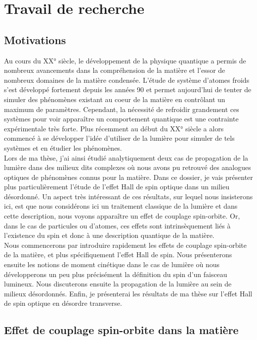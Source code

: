 \documentclass[a4paper,11pt]{article} %
\begin{document}
	
	\section{Travail de recherche}
	\subsection{Motivations}
	Au cours du XX° siècle, le développement de la physique quantique a permis de nombreux avancements dans la compréhension de la matière et l'essor de nombreux domaines de la matière condensée. L'étude de système d'atomes froids s'est développé fortement depuis les années 90 et permet aujourd'hui de tenter de simuler des phénomènes existant au coeur de la matière en contrôlant un maximum de paramètres. Cependant, la nécessité de refroidir grandement ces systèmes pour voir apparaître un comportement quantique est une contrainte expérimentale très forte. Plus récemment au début du XX° siècle a alors commencé à se développer l'idée d'utiliser de la lumière pour simuler de tels systèmes et en étudier les phénomènes.\\
	
	Lors de ma thèse, j'ai ainsi étudié analytiquement deux cas de propagation de la lumière dans des milieux dits complexes où nous avons pu retrouvé des analogues optiques de phénomènes connus pour la matière. Dans ce dossier, je vais présenter plus particulièrement l'étude de l'effet Hall de spin optique dans un milieu désordonné. Un aspect très intéressant de ces résultats, sur lequel nous insisterons ici, est que nous considérons ici un traitement classique de la lumière et dans cette description, nous voyons apparaître un effet de couplage spin-orbite. Or, dans le cas de particules ou d'atomes, ces effets sont intrinsèquement liés à l'existence du spin et donc à une description quantique de la matière.\\
	
	Nous commencerons par introduire rapidement les effets de couplage spin-orbite de la matière, et plus spécifiquement l'effet Hall de spin. Nous présenterons ensuite les notions de moment cinétique dans le cas de lumière où nous développerons un peu plus précisément la définition du spin d'un faisceau lumineux. Nous discuterons ensuite la propagation de la lumière au sein de milieux désordonnés. Enfin, je présenterai les résultats de ma thèse sur l'effet Hall de spin optique en désordre transverse.\\
	
	
	\subsection{Effet de couplage spin-orbite dans la matière}
\end{document}
